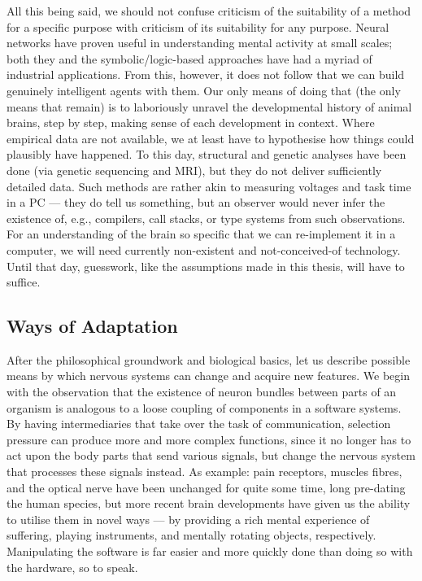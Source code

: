 All this being said, we should not confuse criticism of the suitability of a method for a specific purpose with criticism of its suitability for any purpose. Neural networks have proven useful in understanding mental activity at small scales; both they and the symbolic/logic-based approaches have had a myriad of industrial applications. From this, however, it does not follow that we can build genuinely intelligent agents with them. Our only means of doing that (the only means that remain) is to laboriously unravel the developmental history of animal brains, step by step, making sense of each development in context. Where empirical data are not available, we at least have to hypothesise how things could plausibly have happened. To this day, structural and genetic analyses have been done (via genetic sequencing and MRI), but they do not deliver sufficiently detailed data. Such methods are rather akin to measuring voltages and task time in a PC --- they do tell us something, but an observer would never infer the existence of, e.g., compilers, call stacks, or type systems from such observations. For an understanding of the brain so specific that we can re-implement it in a computer, we will need currently non-existent and not-conceived-of technology. Until that day, guesswork, like the assumptions made in this thesis, will have to suffice.

\subsection{Ways of Adaptation}

After the philosophical groundwork and biological basics, let us describe possible means by which nervous systems can change and acquire new features. We begin with the observation that the existence of neuron bundles between parts of an organism is analogous to a loose coupling of components in a software systems. By having intermediaries that take over the task of communication, selection pressure can produce more and more complex functions, since it no longer has to act upon the body parts that send various signals, but change the nervous system that processes these signals instead. As example: pain receptors, muscles fibres, and the optical nerve have been unchanged for quite some time, long pre-dating the human species, but more recent brain developments have given us the ability to utilise them in novel ways --- by providing a rich mental experience of suffering, playing instruments, and mentally rotating objects, respectively. Manipulating the software is far easier and more quickly done than doing so with the hardware, so to speak.

